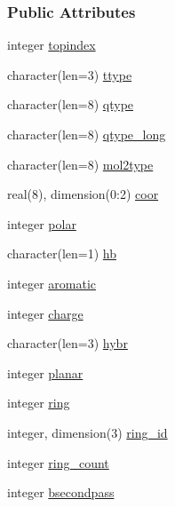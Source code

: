 \subsubsection*{Public Attributes}
\begin{DoxyCompactItemize}
\item 
integer \hyperlink{structcalc__pmf_1_1tpmfatom_a4ad18214402af65031321b7ddd344b00}{topindex}
\item 
character(len=3) \hyperlink{structcalc__pmf_1_1tpmfatom_af07091b078c59160e3c3da81a42e98ad}{ttype}
\item 
character(len=8) \hyperlink{structcalc__pmf_1_1tpmfatom_af441c18f6d6aa0098be350e3c553dad9}{qtype}
\item 
character(len=8) \hyperlink{structcalc__pmf_1_1tpmfatom_af9fdcaa2eec8f9fbec5977fbd09ba113}{qtype\-\_\-long}
\item 
character(len=8) \hyperlink{structcalc__pmf_1_1tpmfatom_a0fb9f4bbb93b060b1bbb169ccd4eab5d}{mol2type}
\item 
real(8), dimension(0\-:2) \hyperlink{structcalc__pmf_1_1tpmfatom_a29f4e9abcc93bc7da749c6a1e322b6c7}{coor}
\item 
integer \hyperlink{structcalc__pmf_1_1tpmfatom_a2a64b45b495bdf90bf1e3dcab58c5d44}{polar}
\item 
character(len=1) \hyperlink{structcalc__pmf_1_1tpmfatom_a365f3fac20021dcfe68b5ced49e646cf}{hb}
\item 
integer \hyperlink{structcalc__pmf_1_1tpmfatom_a23ac509e4e8510f7660bb981fe71ccf5}{aromatic}
\item 
integer \hyperlink{structcalc__pmf_1_1tpmfatom_a2be2ed387eda26b764c9d48c95702cd4}{charge}
\item 
character(len=3) \hyperlink{structcalc__pmf_1_1tpmfatom_aca751f5a06d770d5a01e86e37df6008e}{hybr}
\item 
integer \hyperlink{structcalc__pmf_1_1tpmfatom_a000cbd6dd4feccffaa9aeaa7ed78bb71}{planar}
\item 
integer \hyperlink{structcalc__pmf_1_1tpmfatom_ae7241d0213360f638bbf55e20ed3cb49}{ring}
\item 
integer, dimension(3) \hyperlink{structcalc__pmf_1_1tpmfatom_af67413f119cdaddf756d2cf4d461872c}{ring\-\_\-id}
\item 
integer \hyperlink{structcalc__pmf_1_1tpmfatom_a150b9a0df81b3f38699f8ebf5e071bd9}{ring\-\_\-count}
\item 
integer \hyperlink{structcalc__pmf_1_1tpmfatom_a39689a003047821a24d619c1525cc9c4}{bsecondpass}
\item 

\end{DoxyCompactItemize}
